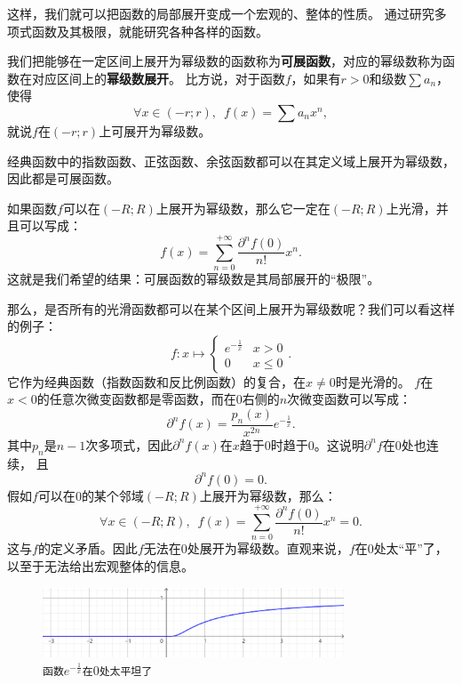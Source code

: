 \documentclass[12pt,UTF8]{ctexbook}
\theoremstyle{definition}
\theoremstyle{plain}
\newtheorem{sk}{思考}[section]
\begin{document}
这样，我们就可以把函数的局部展开变成一个宏观的、整体的性质。
通过研究多项式函数及其极限，就能研究各种各样的函数。

我们把能够在一定区间上展开为幂级数的函数称为\textbf{可展函数}，对应的幂级数称为函数在对应区间上的\textbf{幂级数展开}。
比方说，对于函数$f$，如果有$r>0$和级数$\sum a_n$，使得
$$\forall x\in (-r;r),\,\,\, f(x) = \sum a_n x^n,$$
就说$f$在$(-r;r)$上可展开为幂级数。

经典函数中的指数函数、正弦函数、余弦函数都可以在其定义域上展开为幂级数，因此都是可展函数。

如果函数$f$可以在$(-R;R)$上展开为幂级数，那么它一定在$(-R;R)$上光滑，并且可以写成：
$$ f(x) = \sum_{n=0}^{+\infty} \frac{\partial^n f(0)}{n!} x^n. $$
这就是我们希望的结果：可展函数的幂级数是其局部展开的“极限”。

那么，是否所有的光滑函数都可以在某个区间上展开为幂级数呢？我们可以看这样的例子：
$$ f: x\mapsto \begin{cases} e^{-\frac{1}{x}} & x > 0 \\ 0 & x \leqslant 0 \end{cases}.$$
它作为经典函数（指数函数和反比例函数）的复合，在$x\neq 0$时是光滑的。
$f$在$x<0$的任意次微变函数都是零函数，而在$0$右侧的$n$次微变函数可以写成：
$$ \partial^n f(x) = \frac{p_n(x)}{x^{2n}} e^{-\frac{1}{x}}.$$
其中$p_n$是$n-1$次多项式，因此$\partial^n f(x)$在$x$趋于$0$时趋于$0$。这说明$\partial^n f$在$0$处也连续，
且
$$ \partial^n f(0) = 0.$$
假如$f$可以在$0$的某个邻域$(-R;R)$上展开为幂级数，那么：
$$ \forall x \in (-R;R) ,\,\,\, f(x) = \sum_{n=0}^{+\infty} \frac{\partial^n f(0)}{n!} x^n = 0. $$
这与$f$的定义矛盾。因此$f$无法在$0$处展开为幂级数。直观来说，$f$在$0$处太“平”了，以至于无法给出宏观整体的信息。

\begin{figure}[h] %
    \centering
    \includegraphics[width=0.8\textwidth]{tu/幂级数2.png}
    \caption*{\texttt{函数}$\displaystyle e^{-\frac{1}{x}}$\texttt{在}$0$\texttt{处太平坦了}}
\end{figure}

\end{document}
